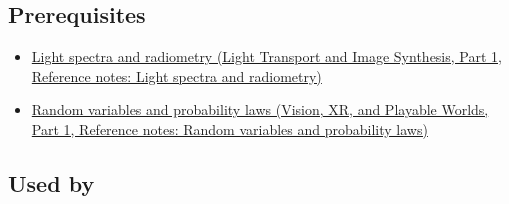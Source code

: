 \subsection{Prerequisites}\label{appendix-4815cd87ab8b-prerequisites}

\hypertarget{appendix-4815cd87ab8b-prerequisites}{}

\begin{itemize}
\tightlist
\item
  \href{../04-Light-Transport-and-Image-Synthesis-P01/main.pdf\#nameddest=appendix-215c2570199b}{Light spectra and radiometry (Light Transport and Image Synthesis, Part 1, Reference notes: Light spectra and radiometry)}
\item
  \href{../07-Vision-XR-and-Playable-Worlds-P01/main.pdf\#nameddest=appendix-4d0203f7944f}{Random variables and probability laws (Vision, XR, and Playable Worlds, Part 1, Reference notes: Random variables and probability laws)}
\end{itemize}

\subsection{Used by}\label{appendix-4815cd87ab8b-used-by}

\hypertarget{appendix-4815cd87ab8b-used-by}{}

